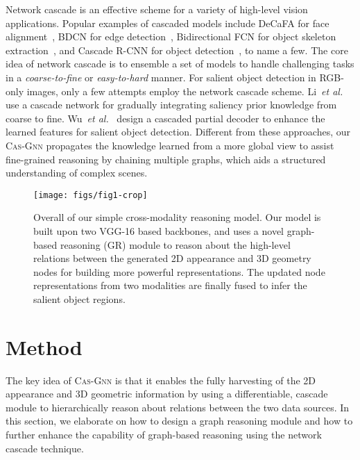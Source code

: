 \documentclass[runningheads]{llncs}
\begin{document}
		

		Network cascade is an effective scheme for a variety of high-level vision applications. Popular examples of cascaded models include DeCaFA for face alignment~\cite{Dapogny_2019_ICCV}, BDCN for edge detection~\cite{He_2019_CVPR}, Bidirectional FCN for object skeleton extraction~\cite{yang2018multi}, and Cascade R-CNN for object detection~\cite{Cai_2018_CVPR}, to name a few. The core idea of network cascade is to ensemble a set of models to handle challenging tasks in a \emph{coarse-to-fine} or \emph{easy-to-hard} manner. For salient object detection in RGB-only images, only a few attempts employ the network cascade scheme. Li~\emph{et al.}~\cite{li2017multi} use a cascade network for gradually integrating saliency prior knowledge from coarse to fine. Wu~\emph{et al.}~\cite{Wu_2019_CVPR} design a cascaded partial decoder to enhance the learned features for salient object detection. Different from these approaches, our {\scshape{Cas-Gnn}} propagates the knowledge learned from a more global view to assist fine-grained reasoning by chaining multiple graphs, which aids a structured understanding of complex scenes.
		
		
		
				\begin{figure*}[pt]
			\begin{center}
				\texttt{[image: figs/fig1-crop]}
			\end{center}
			\caption{Overall of our simple cross-modality reasoning model. Our model is built upon two VGG-16 based backbones, and uses a novel graph-based reasoning (GR) module to reason about the high-level relations between the generated 2D appearance and 3D geometry nodes for building more powerful representations. The updated node representations from two modalities are finally fused to infer the salient object regions.}
			
			\label{fig:1}
			
		\end{figure*}
	
\section{Method}
The key idea of {\scshape{Cas-Gnn}} is that it enables the fully harvesting of the 2D appearance and 3D geometric information by using a differentiable, cascade module to hierarchically reason about relations between the two data sources. In this section, we elaborate on how to design a graph reasoning module and how to further enhance the capability of graph-based reasoning using the network cascade technique.  
\end{document}
